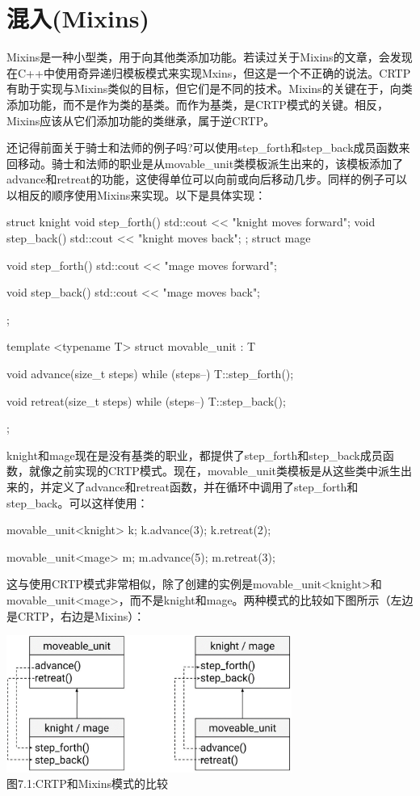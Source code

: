 \section{混入(Mixins)}
Mixins是一种小型类，用于向其他类添加功能。若读过关于Mixins的文章，会发现在C++中使用奇异递归模板模式来实现Mxins，但这是一个不正确的说法。CRTP有助于实现与Mixins类似的目标，但它们是不同的技术。Mixins的关键在于，向类添加功能，而不是作为类的基类。而作为基类，是CRTP模式的关键。相反，Mixins应该从它们添加功能的类继承，属于逆CRTP。

还记得前面关于骑士和法师的例子吗?可以使用step\_forth和step\_back成员函数来回移动。骑士和法师的职业是从movable\_unit类模板派生出来的，该模板添加了advance和retreat的功能，这使得单位可以向前或向后移动几步。同样的例子可以以相反的顺序使用Mixins来实现。以下是具体实现：

\begin{cpp}
struct knight
{
	void step_forth()
	{
		std::cout << "knight moves forward\n";
	}
	void step_back()
	{
		std::cout << "knight moves back\n";
	}
};
struct mage
{
	void step_forth()
	{
		std::cout << "mage moves forward\n";
	}

	void step_back()
	{
		std::cout << "mage moves back\n";
	}
};

template <typename T>
struct movable_unit : T
{
	void advance(size_t steps)
	{
		while (steps--)
			T::step_forth();
	}

	void retreat(size_t steps)
	{
		while (steps--)
			T::step_back();
	}
};
\end{cpp}

knight和mage现在是没有基类的职业，都提供了step\_forth和step\_back成员函数，就像之前实现的CRTP模式。现在，movable\_unit类模板是从这些类中派生出来的，并定义了advance和retreat函数，并在循环中调用了step\_forth和step\_back。可以这样使用：

\begin{cpp}
movable_unit<knight> k;
k.advance(3);
k.retreat(2);

movable_unit<mage> m;
m.advance(5);
m.retreat(3);
\end{cpp}

这与使用CRTP模式非常相似，除了创建的实例是movable\_unit<knight>和movable\_unit<mage>，而不是knight和mage。两种模式的比较如下图所示（左边是CRTP，右边是Mixins）：

\begin{center}
\includegraphics[width=0.7\textwidth]{images/1.png}\\
图7.1:CRTP和Mixins模式的比较
\end{center}

